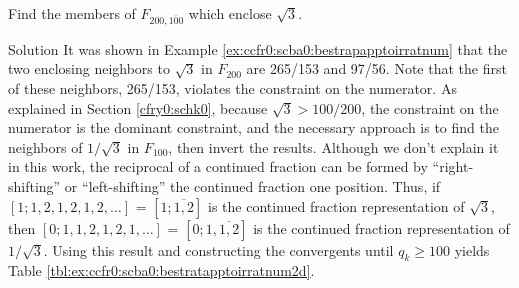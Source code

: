 \begin{vworkexamplestatement}
\label{ex:ccfr0:scba0:bestratapptoirratnum2d}
Find the members of $F_{200,\overline{100}}$ which 
enclose $\sqrt{3}$.
\end{vworkexamplestatement}
\begin{vworkexampleparsection}{Solution}
It was shown in Example \ref{ex:ccfr0:scba0:bestrapapptoirratnum}
that the two enclosing neighbors to $\sqrt{3}$ in 
$F_{200}$ are 265/153 and 97/56.  Note that the first of
these neighbors, 265/153, violates the constraint on the
numerator.
As explained in Section \ref{cfry0:schk0},
because $\sqrt{3} > 100/200$, the constraint on the
numerator is the dominant constraint, and the necessary
approach is to find the neighbors of $1/\sqrt{3}$ in
$F_{100}$, then invert the results.
Although we don't explain it in this work,
the reciprocal of a continued fraction can be formed by
``right-shifting'' or ``left-shifting'' the continued fraction one position.
Thus, if $[1;1,2,1,2,1,2, \ldots{}]$ = $[1;\overline{1,2}]$
is the continued fraction representation of $\sqrt{3}$, then
$[0;1,1,2,1,2,1, \ldots{}]$ = $[0;1,\overline{1,2}]$ is the
continued fraction representation of $1/\sqrt{3}$.  Using
this result and constructing the convergents until
$q_k \geq 100$ yields Table \ref{tbl:ex:ccfr0:scba0:bestratapptoirratnum2d}.


\end{vworkexampleparsection}
